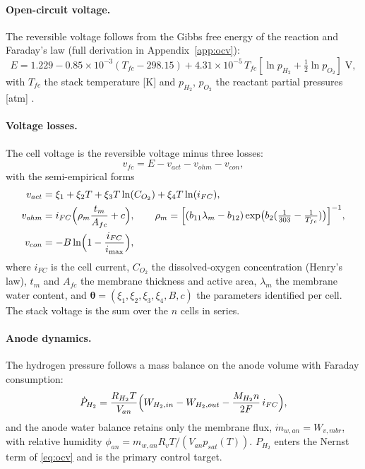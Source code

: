 \documentclass[11pt,a4paper]{article}
\begin{document}
\paragraph{Open-circuit voltage.}
The reversible voltage follows from the Gibbs free energy of the reaction and
Faraday's law (full derivation in Appendix~\ref{app:ocv}):
\begin{equation}
    \label{eq:ocv}
    E = 1.229 - 0.85\times10^{-3}(T_{fc}-298.15)
      + 4.31\times10^{-5}\,T_{fc}\left[\ln p_{H_2} + \tfrac{1}{2}\ln p_{O_2}\right]\;\mathrm{V},
\end{equation}
with $T_{fc}$ the stack temperature [K] and $p_{H_2}$, $p_{O_2}$ the reactant
partial pressures [atm] \cite{pukrushpan2003}.

\paragraph{Voltage losses.}
The cell voltage is the reversible voltage minus three losses:
\begin{equation}
    \label{eq:vfc}
    v_{fc} = E - v_{act} - v_{ohm} - v_{con},
\end{equation}
with the semi-empirical forms \cite{pukrushpan2003,thanapalan2008,cao2019}
\begin{align}
    v_{act} &= \xi_1+\xi_2 T+\xi_3 T\ln(C_{O_2})+\xi_4 T\ln(i_{FC}),
    \label{eq:vact}\\
    v_{ohm} &= i_{FC}\Bigl(\rho_m\frac{t_m}{A_{fc}}+c\Bigr),
    \qquad
    \rho_m = \Bigl[(b_{11}\lambda_m-b_{12})
              \exp\bigl(b_2(\tfrac{1}{303}-\tfrac{1}{T_{fc}})\bigr)\Bigr]^{-1},
    \label{eq:vohm}\\
    v_{con} &= -B\ln\Bigl(1-\frac{i_{FC}}{i_{\max}}\Bigr),
    \label{eq:vcon}
\end{align}
where $i_{FC}$ is the cell current, $C_{O_2}$ the dissolved-oxygen concentration
(Henry's law), $t_m$ and $A_{fc}$ the membrane thickness and active area,
$\lambda_m$ the membrane water content, and
$\boldsymbol{\theta}=(\xi_1,\xi_2,\xi_3,\xi_4,B,c)$ the parameters identified per
cell. The stack voltage is the sum over the $n$ cells in series.

\paragraph{Anode dynamics.}
The hydrogen pressure follows a mass balance on the anode volume with Faraday
consumption:
\begin{equation}
    \label{eq:anode}
    \dot{P}_{H_2}=\frac{R_{H_2}T}{V_{an}}
    \Bigl(W_{H_2,in}-W_{H_2,out}-\frac{M_{H_2}n}{2F}\,i_{FC}\Bigr),
\end{equation}
and the anode water balance retains only the membrane flux,
$\dot{m}_{w,an}=W_{v,mbr}$, with relative humidity
$\phi_{an}=m_{w,an}R_vT/(V_{an}p_{sat}(T))$. $P_{H_2}$ enters the Nernst term of
\eqref{eq:ocv} and is the primary control target.
\end{document}
